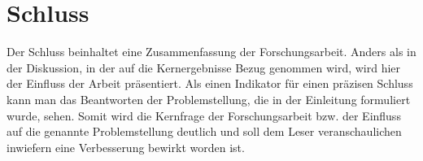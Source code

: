 
\chapter{Schluss}
\label{chap:Schluss}


Der Schluss beinhaltet eine Zusammenfassung der Forschungsarbeit. Anders als in der Diskussion, in der auf die Kernergebnisse Bezug genommen wird, wird hier der Einfluss der Arbeit präsentiert. Als einen Indikator für einen präzisen Schluss kann man das Beantworten der Problemstellung, die in der Einleitung formuliert wurde, sehen. Somit wird die Kernfrage der Forschungsarbeit bzw. der Einfluss auf die genannte Problemstellung deutlich und soll dem Leser veranschaulichen inwiefern eine Verbesserung bewirkt worden ist.  


